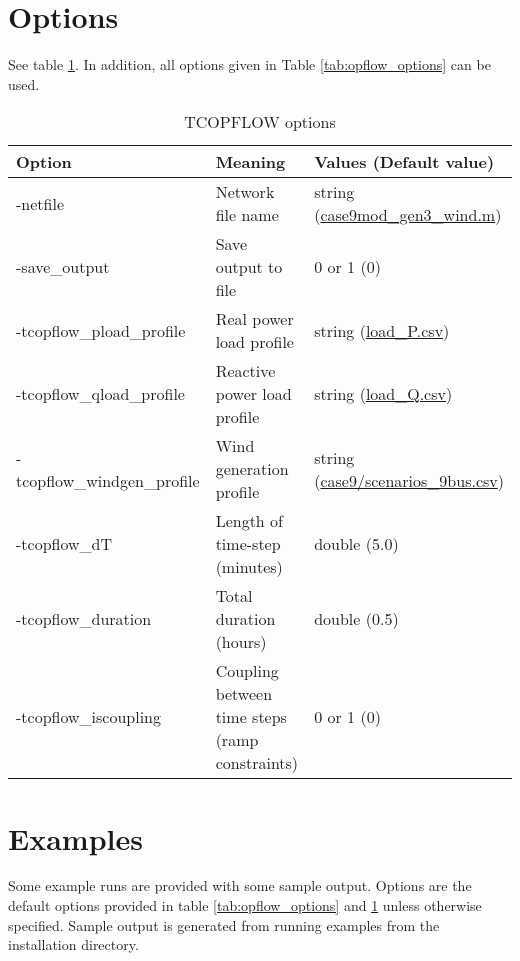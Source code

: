 \section{Options}
See table \ref{tab:tcopflow_options}. In addition, all \opflow options given in Table \ref{tab:opflow_options} can be used.
\begin{table}[!htbp]
  \caption{TCOPFLOW options}
  \small
  \begin{tabular}{|p{}|p{}|p{}|}
    \hline
    \textbf{Option} & \textbf{Meaning} & \textbf{Values (Default value)} \\ \hline
    -netfile & Network file name & string (\href{https://gitlab.pnnl.gov/exasgd/frameworks/exago/-/blob/master/datafiles/case9/case9mod_gen3_wind.m}{case9mod\_gen3\_wind.m}) \\ \hline
    -save\_output & Save output to file & 0 or 1 (0) \\ \hline
    -tcopflow\_pload\_profile & Real power load profile & string (\href{https://gitlab.pnnl.gov/exasgd/frameworks/exago/-/blob/master/datafiles/case9/load_P.csv}{load\_P.csv}) \\ \hline
    -tcopflow\_qload\_profile & Reactive power load profile & string (\href{https://gitlab.pnnl.gov/exasgd/frameworks/exago/-/blob/master/datafiles/case9/load_Q.csv}{load\_Q.csv}) \\ \hline
    -tcopflow\_windgen\_profile & Wind generation profile & string (\href{https://gitlab.pnnl.gov/exasgd/frameworks/exago/-/blob/master/datafiles/case9/scenarios_9bus.csv}{case9/scenarios\_9bus.csv}) \\ \hline
    -tcopflow\_dT & Length of time-step (minutes) & double (5.0) \\ \hline
    -tcopflow\_duration & Total duration (hours) & double (0.5) \\ \hline 
    -tcopflow\_iscoupling & Coupling between time steps (ramp constraints) & 0 or 1 (0) \\ \hline
  \end{tabular}
  \label{tab:tcopflow_options}
\end{table}
\section{Examples}
Some \tcopflow example runs are provided with some sample output. Options are the default options provided in table \ref{tab:opflow_options} and \ref{tab:tcopflow_options} unless otherwise specified. Sample output is generated from running examples from the installation directory.


